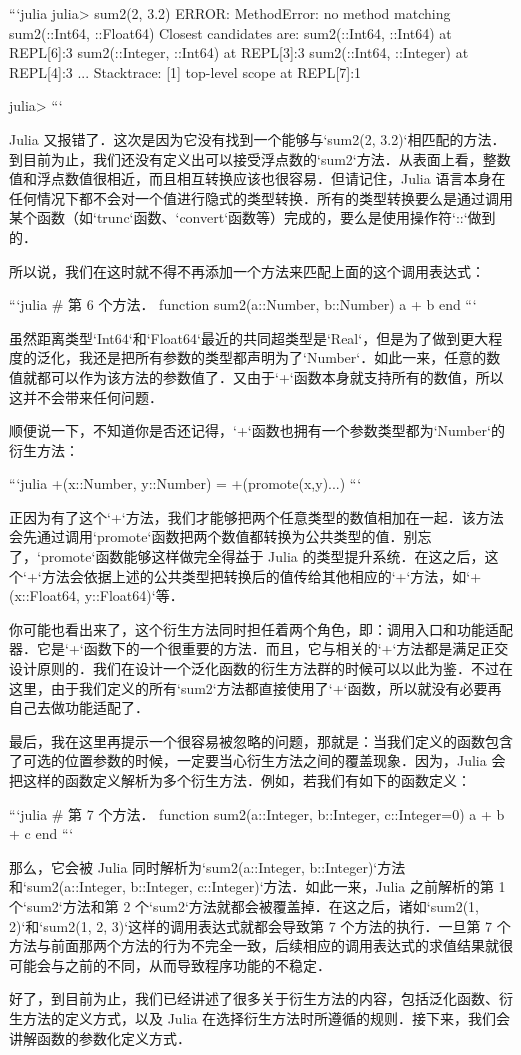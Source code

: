 ```julia
julia> sum2(2, 3.2)
ERROR: MethodError: no method matching sum2(::Int64, ::Float64)
Closest candidates are:
  sum2(::Int64, ::Int64) at REPL[6]:3
  sum2(::Integer, ::Int64) at REPL[3]:3
  sum2(::Int64, ::Integer) at REPL[4]:3
  ...
Stacktrace:
 [1] top-level scope at REPL[7]:1

julia> 
```

Julia 又报错了．这次是因为它没有找到一个能够与`sum2(2, 3.2)`相匹配的方法．到目前为止，我们还没有定义出可以接受浮点数的`sum2`方法．从表面上看，整数值和浮点数值很相近，而且相互转换应该也很容易．但请记住，Julia 语言本身在任何情况下都不会对一个值进行隐式的类型转换．所有的类型转换要么是通过调用某个函数（如`trunc`函数、`convert`函数等）完成的，要么是使用操作符`::`做到的．

所以说，我们在这时就不得不再添加一个方法来匹配上面的这个调用表达式：

```julia
# 第 6 个方法．
function sum2(a::Number, b::Number)
    a + b
end
```

虽然距离类型`Int64`和`Float64`最近的共同超类型是`Real`，但是为了做到更大程度的泛化，我还是把所有参数的类型都声明为了`Number`．如此一来，任意的数值就都可以作为该方法的参数值了．又由于`+`函数本身就支持所有的数值，所以这并不会带来任何问题．

顺便说一下，不知道你是否还记得，`+`函数也拥有一个参数类型都为`Number`的衍生方法：

```julia
+(x::Number, y::Number) = +(promote(x,y)...)
```

正因为有了这个`+`方法，我们才能够把两个任意类型的数值相加在一起．该方法会先通过调用`promote`函数把两个数值都转换为公共类型的值．别忘了，`promote`函数能够这样做完全得益于 Julia 的类型提升系统．在这之后，这个`+`方法会依据上述的公共类型把转换后的值传给其他相应的`+`方法，如`+(x::Float64, y::Float64)`等．

你可能也看出来了，这个衍生方法同时担任着两个角色，即：调用入口和功能适配器．它是`+`函数下的一个很重要的方法．而且，它与相关的`+`方法都是满足正交设计原则的．我们在设计一个泛化函数的衍生方法群的时候可以以此为鉴．不过在这里，由于我们定义的所有`sum2`方法都直接使用了`+`函数，所以就没有必要再自己去做功能适配了．

最后，我在这里再提示一个很容易被忽略的问题，那就是：当我们定义的函数包含了可选的位置参数的时候，一定要当心衍生方法之间的覆盖现象．因为，Julia 会把这样的函数定义解析为多个衍生方法．例如，若我们有如下的函数定义：

```julia
# 第 7 个方法．
function sum2(a::Integer, b::Integer, c::Integer=0)
    a + b + c
end
```

那么，它会被 Julia 同时解析为`sum2(a::Integer, b::Integer)`方法和`sum2(a::Integer, b::Integer, c::Integer)`方法．如此一来，Julia 之前解析的第 1 个`sum2`方法和第 2 个`sum2`方法就都会被覆盖掉．在这之后，诸如`sum2(1, 2)`和`sum2(1, 2, 3)`这样的调用表达式就都会导致第 7 个方法的执行．一旦第 7 个方法与前面那两个方法的行为不完全一致，后续相应的调用表达式的求值结果就很可能会与之前的不同，从而导致程序功能的不稳定．

好了，到目前为止，我们已经讲述了很多关于衍生方法的内容，包括泛化函数、衍生方法的定义方式，以及 Julia 在选择衍生方法时所遵循的规则．接下来，我们会讲解函数的参数化定义方式．